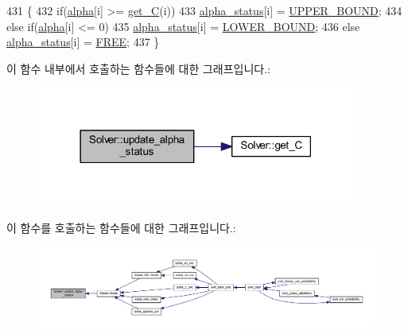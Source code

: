 \begin{DoxyCode}
431     \{
432         \textcolor{keywordflow}{if}(\hyperlink{class_solver_a00d7a7cefa2504d41c7db6cd7cc6b428}{alpha}[i] >= \hyperlink{class_solver_ae55a8581815436d13e760dadaec34e2a}{get\_C}(i))
433             \hyperlink{class_solver_a9fe653e04c43956d5fb86635651b0003}{alpha\_status}[i] = \hyperlink{class_solver_a86c1a7637bc803ef8496c7dbf7f00b03aef825a32b2471cdb0724cfa9c1f051fd}{UPPER\_BOUND};
434         \textcolor{keywordflow}{else} \textcolor{keywordflow}{if}(\hyperlink{class_solver_a00d7a7cefa2504d41c7db6cd7cc6b428}{alpha}[i] <= 0)
435             \hyperlink{class_solver_a9fe653e04c43956d5fb86635651b0003}{alpha\_status}[i] = \hyperlink{class_solver_a86c1a7637bc803ef8496c7dbf7f00b03aeb78558e05ec0672378c3e801e866560}{LOWER\_BOUND};
436         \textcolor{keywordflow}{else} \hyperlink{class_solver_a9fe653e04c43956d5fb86635651b0003}{alpha\_status}[i] = \hyperlink{class_solver_a86c1a7637bc803ef8496c7dbf7f00b03a904f6af2170b6f900fbd3d46cd055c76}{FREE};
437     \}
\end{DoxyCode}


이 함수 내부에서 호출하는 함수들에 대한 그래프입니다.\+:
\nopagebreak
\begin{figure}[H]
\begin{center}
\leavevmode
\includegraphics[width=297pt]{class_solver_a5a978b4ff9b60b2d75e54970fd6a2c20_cgraph}
\end{center}
\end{figure}




이 함수를 호출하는 함수들에 대한 그래프입니다.\+:
\nopagebreak
\begin{figure}[H]
\begin{center}
\leavevmode
\includegraphics[width=350pt]{class_solver_a5a978b4ff9b60b2d75e54970fd6a2c20_icgraph}
\end{center}
\end{figure}




